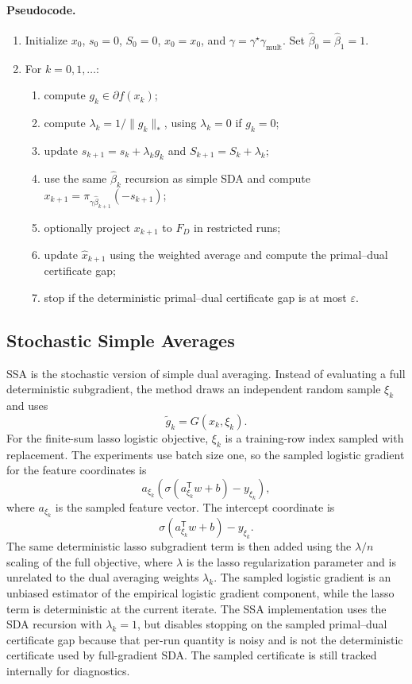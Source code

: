 \documentclass[11pt]{article}
\begin{document}
\paragraph{Pseudocode.}
\begin{enumerate}
    \item Initialize \(x_0\), \(s_0=0\), \(S_0=0\), \(\hat x_0=x_0\), and
    \(\gamma=\gamma^\star\gamma_{\mathrm{mult}}\).  Set
    \(\hat\beta_0=\hat\beta_1=1\).
    \item For \(k=0,1,\ldots\):
    \begin{enumerate}
        \item compute \(g_k\in\partial f(x_k)\);
        \item compute \(\lambda_k=1/\|g_k\|_*\), using \(\lambda_k=0\) if
        \(g_k=0\);
        \item update \(s_{k+1}=s_k+\lambda_k g_k\) and
        \(S_{k+1}=S_k+\lambda_k\);
        \item use the same \(\hat\beta_k\) recursion as simple SDA and compute
        \(x_{k+1}=\pi_{\gamma\hat\beta_{k+1}}(-s_{k+1})\);
        \item optionally project \(x_{k+1}\) to \(F_D\) in restricted runs;
        \item update \(\hat x_{k+1}\) using the weighted average and compute
        the primal--dual certificate gap;
        \item stop if the deterministic primal--dual certificate gap is at
        most \(\varepsilon\).
    \end{enumerate}
\end{enumerate}

\subsection{Stochastic Simple Averages}

SSA is the stochastic version of simple dual averaging.  Instead of evaluating
a full deterministic subgradient, the method draws an independent random
sample \(\xi_k\) and uses
\[
    \tilde g_k=G(x_k,\xi_k).
\]
For the finite-sum lasso logistic objective, \(\xi_k\) is a training-row index
sampled with replacement.  The experiments use batch size one, so the sampled
logistic gradient for the feature coordinates is
\[
    a_{\xi_k}\left(\sigma(a_{\xi_k}^{\mathsf T}w+b)-y_{\xi_k}\right),
\]
where \(a_{\xi_k}\) is the sampled feature vector.  The intercept coordinate is
\[
    \sigma(a_{\xi_k}^{\mathsf T}w+b)-y_{\xi_k}.
\]
The same deterministic lasso subgradient term is then added using the
\(\lambda/n\) scaling of the full objective, where \(\lambda\) is the lasso
regularization parameter and is unrelated to the dual averaging weights
\(\lambda_k\).  The sampled logistic gradient is an unbiased estimator of the
empirical logistic gradient component, while the lasso term is deterministic at
the current iterate.  The SSA implementation uses the SDA recursion with
\(\lambda_k=1\), but disables stopping on the sampled primal--dual certificate
gap because that per-run quantity is noisy and is not the deterministic
certificate used by full-gradient SDA.  The sampled certificate is still
tracked internally for diagnostics.
\end{document}
